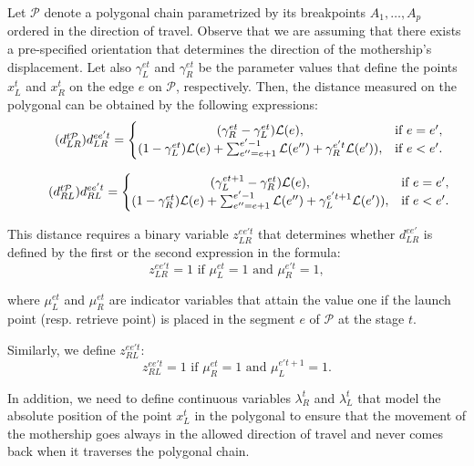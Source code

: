 Let $\mathcal P$ denote a polygonal chain parametrized by its breakpoints $A_1, \ldots, A_p$ ordered in the direction of travel. Observe that we are assuming that there exists a pre-specified orientation that determines the direction of the mothership's displacement. Let also $\gamma_L^{et}$ and $\gamma_R^{et}$ be the parameter values that define the points $x_L^t$ and $x_R^t$ on the edge $e$ on $\mathcal P$, respectively.  Then, the distance measured on the polygonal can be obtained by the following expressions:
\begin{equation}\tag{$d^{t\mathcal P}_{LR}$}\label{eq:dLRPt}
d_{LR}^{ee't} = \left\{\begin{matrix}
(\gamma_R^{et} - \gamma_L^{et})\mathcal L(e), & \text{if } e = e',\\ 
(1 - \gamma_L^{et})\mathcal L(e) + \sum_{e'' = e+1}^{e'-1}\mathcal L(e'') + \gamma_{R}^{e't}\mathcal L(e')), & \text{if } e < e'.
\end{matrix}\right.
\end{equation}

\begin{equation}\tag{$d^{t\mathcal P}_{RL}$}\label{eq:dRLPt}
d_{RL}^{ee't} = \left\{\begin{matrix}
(\gamma_{L}^{et+1}-\gamma_R^{et})\mathcal L(e), & \text{if } e = e',\\ 
(1 - \gamma_R^{et})\mathcal L(e) + \sum_{e'' = e+1}^{e'-1}\mathcal L(e'') + \gamma_{L}^{e't+1}\mathcal L(e')), & \text{if } e < e'.
\end{matrix}\right.
\end{equation}

This distance requires a binary variable $z_{LR}^{ee't}$ that determines whether $d_{LR}^{ee'}$ is defined by the first or the second expression in the formula:
$$z_{LR}^{ee't} = 1 \text{ if } \mu_{L}^{et} = 1 \text{ and }\mu_{R}^{e't} = 1,$$

\noindent where $\mu_{L}^{et}$ and $\mu_{R}^{et}$ are indicator variables that attain the value one if the launch point (resp. retrieve point) is placed in the segment $e$ of $\mathcal P$ at the stage $t$.

Similarly, we define $z_{RL}^{ee't}$:
$$z_{RL}^{ee't} = 1 \text{ if } \mu_{R}^{et} = 1 \text{ and }\mu_{L}^{e't+1} = 1.$$

In addition, we need to define continuous variables $\lambda_R^t$ and $\lambda_L^t$ that model the absolute position of the point $x_L^t$ in the polygonal to ensure that the movement of the mothership goes always in the allowed direction of travel and never comes back when it traverses the polygonal chain. 

